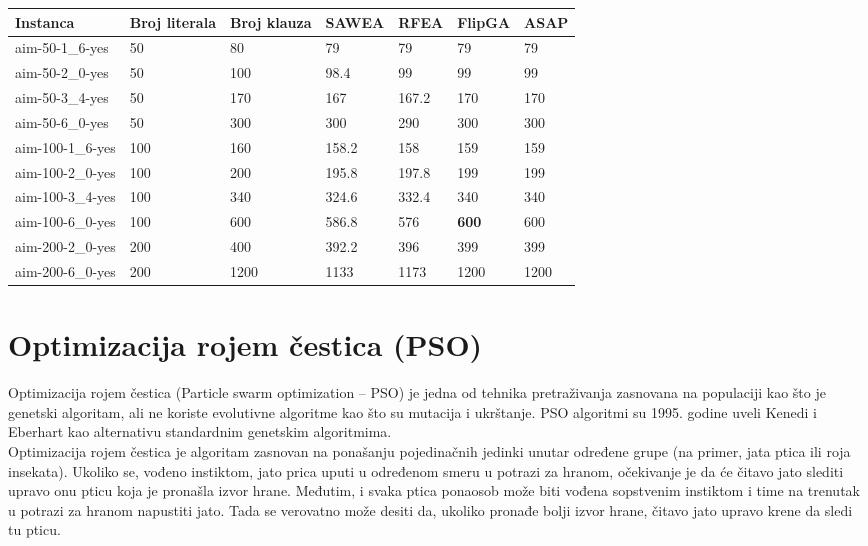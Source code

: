 \documentclass{article}
\begin{document}
\begin{table}[h!]
\centering
{}\label{tab:ea_SAT} 
\begin{tabular}{ |p{3cm}|p{1.6cm}|p{1.6cm}||p{1.6cm}|p{1.6cm}|p{1.6cm}|p{1.6cm}|} \hline
 Instanca & Broj \break literala & Broj \break klauza & SAWEA & RFEA & FlipGA & ASAP \\ \hline
 aim-50-1\_6-yes & 50 & 80 & 79 & 79 & 79 &  79 \\ \hline
 aim-50-2\_0-yes & 50 & 100 &  98.4 &  99 & 99 & 99 \\ \hline
 aim-50-3\_4-yes & 50 & 170 & 167 & 167.2 & 170 & 170  \\ \hline
 aim-50-6\_0-yes & 50 & 300 &  300 & 290 &  300 &  300 \\ \hline 
 \hline
 aim-100-1\_6-yes & 100 & 160 & 158.2 & 158 &  159 & 159 \\ \hline
 aim-100-2\_0-yes & 100 & 200 & 195.8 &  197.8 & 199 &  199 \\ \hline
 aim-100-3\_4-yes & 100 & 340 & 324.6  & 332.4 & 340 & 340 \\ \hline
 aim-100-6\_0-yes & 100 & 600 &  586.8 & 576 & \textbf{600} & 600 \\ \hline
 \hline
 aim-200-2\_0-yes & 200 & 400 &  392.2 & 396 & 399 & 399 \\ \hline
 aim-200-6\_0-yes & 200 & 1200 & 1133 & 1173 &  1200 & 1200 \\ \hline
\end{tabular} 
\end{table}

\section{Optimizacija rojem čestica (PSO)}
\label{sec:pso}

Optimizacija rojem čestica (Particle swarm optimization – PSO) je jedna od tehnika pretraživanja zasnovana na populaciji kao što je genetski algoritam, ali ne koriste evolutivne algoritme kao što su mutacija i ukrštanje.
PSO algoritmi su 1995. godine uveli Kenedi i Eberhart kao alternativu standardnim genetskim algoritmima. \\

Optimizacija rojem čestica je algoritam zasnovan na ponašanju pojedinačnih jedinki unutar određene grupe (na primer, jata ptica ili roja insekata). Ukoliko se, vođeno instiktom, jato prica uputi u određenom smeru u potrazi za hranom, očekivanje je da će čitavo jato slediti upravo onu pticu koja je pronašla izvor hrane. Međutim, i svaka ptica ponaosob može biti vođena sopstvenim instiktom i time na trenutak u potrazi za hranom napustiti jato. Tada se verovatno može desiti da, ukoliko pronađe bolji izvor hrane, čitavo jato upravo krene da sledi tu pticu. \\
\end{document}
